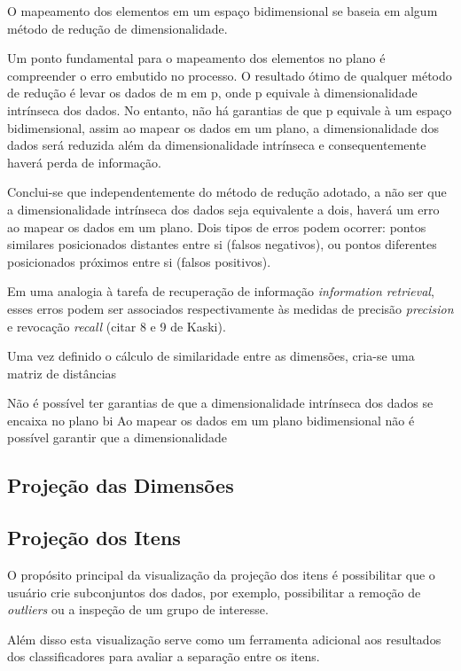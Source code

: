 O mapeamento dos elementos em um espaço bidimensional se baseia em algum método de redução de dimensionalidade. 

Um ponto fundamental para o mapeamento dos elementos no plano é compreender o erro embutido no processo. O resultado ótimo de qualquer método de redução é levar os dados de m em p, onde p equivale à dimensionalidade intrínseca dos dados. No entanto,  não há garantias de que p equivale à um espaço bidimensional, assim ao mapear os dados em um plano, a dimensionalidade dos dados será reduzida além da dimensionalidade intrínseca e consequentemente haverá perda de informação.

Conclui-se que independentemente do método de redução adotado, a não ser que a dimensionalidade intrínseca dos dados seja equivalente a dois, haverá um erro ao mapear os dados em um plano. Dois tipos de erros podem ocorrer: pontos similares posicionados distantes entre si (falsos negativos), ou pontos diferentes posicionados próximos entre si (falsos positivos). 

Em uma analogia à tarefa de recuperação de informação \emph{information retrieval}, esses erros podem ser associados respectivamente às medidas de precisão \emph{precision} e revocação \emph{recall} (citar 8 e 9 de Kaski).

Uma vez definido o cálculo de similaridade entre as dimensões, cria-se uma matriz de distâncias 

Não é possível ter garantias de que a dimensionalidade intrínseca dos dados se encaixa no plano bi
Ao mapear os dados em um plano bidimensional não é possível garantir que a dimensionalidade  

\subsection{Projeção das Dimensões}

\subsection{Projeção dos Itens}

O propósito principal da visualização da projeção dos itens é possibilitar que o usuário crie subconjuntos dos dados, por exemplo, possibilitar a remoção de \emph{outliers} ou a inspeção de um grupo de interesse.

Além disso esta visualização serve como um ferramenta adicional aos resultados dos classificadores para avaliar a separação entre os itens.


